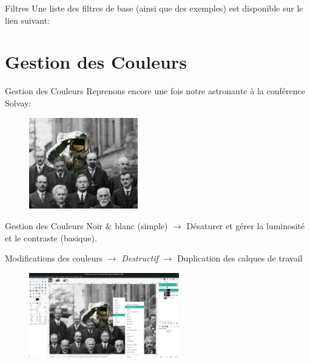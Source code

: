 \documentclass[10pt,svgnames,usenames,table]{beamer}
\begin{document}
\begin{frame}{Filtres}
	Une liste des filtres de base (ainsi que des exemples) est disponible sur le lien suivant:



\end{frame}



\section{Gestion des Couleurs}
	\begin{frame}{Gestion des Couleurs}
		Reprenons encore une fois notre astronaute à la conférence Solvay:

		\begin{figure}
			\centering
			\includegraphics[height=150px]{Images/colours/col1} 
		\end{figure}
	\end{frame}

	\begin{frame}{Gestion des Couleurs}
		Noir \& blanc (simple) $\rightarrow$ Désaturer et gérer la luminosité et le contraste (basique).
	
		Modifications des couleurs $\rightarrow$ \emph{Destructif} $\rightarrow$ Duplication des calques de travail

		\begin{figure}
			\centering
			\includegraphics[height=140px]{Images/colours/col2} 
		\end{figure}
	\end{frame}
\end{document}
